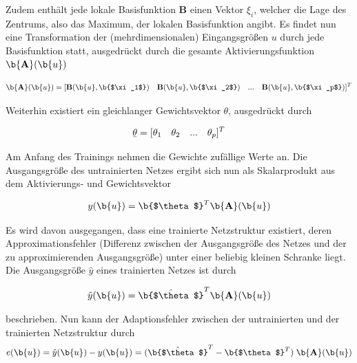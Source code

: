 Zudem enthält jede lokale Basisfunktion $\textbf{B}$ einen Vektor \b{$\xi_i$}, welcher die Lage des Zentrums, also das Maximum, der lokalen Basisfunktion angibt. Es findet nun eine Transformation der (mehrdimensionalen) Eingangsgrößen \b{$u$} durch jede Basisfunktion statt, ausgedrückt durch die gesamte Aktivierungsfunktion $\b{\textbf{A}}(\b{u})$

\begin{equation}
\begin{aligned}
\b{\textbf{A}}(\b{u}) = [\textbf{B}(\b{u},\b{$\xi_1$}) \quad \textbf{B}(\b{u},\b{$\xi_2$}) \quad  ... \quad \textbf{B}(\b{u},\b{$\xi_p$})]^{T}
\end{aligned}
\end{equation}

Weiterhin existiert ein gleichlanger Gewichtsvektor \b{$\theta$}, ausgedrückt durch  

\begin{equation}
\begin{aligned}
\b{$\theta$} = [\theta_{1} \quad \theta_2 \quad ... \quad \theta_{p}]^{T}
\end{aligned}
\end{equation}

Am Anfang des Trainings nehmen die Gewichte zufällige Werte an. Die Ausgangsgröße des untrainierten Netzes ergibt sich nun als Skalarprodukt aus dem Aktivierungs- und Gewichtsvektor

\begin{equation}
\begin{aligned}
y(\b{u}) = \b{$\theta$}^T \b{\textbf{A}}(\b{u})
\end{aligned}
\end{equation}

Es wird davon ausgegangen, dass eine trainierte Netzstruktur existiert, deren Approximationsfehler (Differenz zwischen der Ausgangsgröße des Netzes und der zu approximierenden Ausgangsgröße) unter einer beliebig kleinen Schranke liegt. Die Ausgangsgröße $\hat{y}$ eines trainierten Netzes ist durch 


\begin{equation}
\begin{aligned}
\hat{y}(\b{u}) = \hat{\b{$\theta$}}^T \b{\textbf{A}}(\b{u})
\end{aligned}
\end{equation}

beschrieben. Nun kann der Adaptionsfehler zwischen der untrainierten und der trainierten Netzstruktur durch 
\begin{equation}
\begin{aligned}
e(\b{u}) = \hat{y}(\b{u}) - y(\b{u}) = (\hat{\b{$\theta$}}^T -  \b{$\theta$}^T) \; \b{\textbf{A}}(\b{u})
\end{aligned}
\end{equation}

